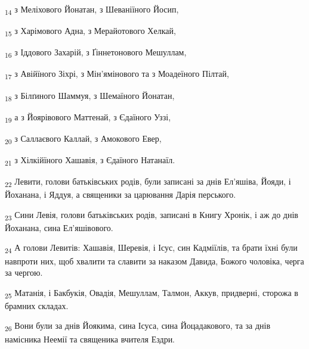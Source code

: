 \begin{tcolorbox}
\textsubscript{14} з Меліхового Йонатан, з Шеваніїного Йосип,
\end{tcolorbox}
\begin{tcolorbox}
\textsubscript{15} з Харімового Адна, з Мерайотового Хелкай,
\end{tcolorbox}
\begin{tcolorbox}
\textsubscript{16} з Іддового Захарій, з Ґіннетонового Мешуллам,
\end{tcolorbox}
\begin{tcolorbox}
\textsubscript{17} з Авійїного Зіхрі, з Мін'ямінового та з Моадеїного Пілтай,
\end{tcolorbox}
\begin{tcolorbox}
\textsubscript{18} з Білґиного Шаммуя, з Шемаїного Йонатан,
\end{tcolorbox}
\begin{tcolorbox}
\textsubscript{19} а з Йоярівового Маттенай, з Єдаїного Уззі,
\end{tcolorbox}
\begin{tcolorbox}
\textsubscript{20} з Саллаєвого Каллай, з Амокового Евер,
\end{tcolorbox}
\begin{tcolorbox}
\textsubscript{21} з Хілкійїного Хашавія, з Єдаїного Натанаїл.
\end{tcolorbox}
\begin{tcolorbox}
\textsubscript{22} Левити, голови батьківських родів, були записані за днів Ел'яшіва, Йояди, і Йоханана, і Яддуя, а священики за царювання Дарія перського.
\end{tcolorbox}
\begin{tcolorbox}
\textsubscript{23} Сини Левія, голови батьківських родів, записані в Книгу Хронік, і аж до днів Йоханана, сина Ел'яшівового.
\end{tcolorbox}
\begin{tcolorbox}
\textsubscript{24} А голови Левитів: Хашавія, Шеревія, і Ісус, син Кадміїлів, та брати їхні були навпроти них, щоб хвалити та славити за наказом Давида, Божого чоловіка, черга за чергою.
\end{tcolorbox}
\begin{tcolorbox}
\textsubscript{25} Матанія, і Бакбукія, Овадія, Мешуллам, Талмон, Аккув, придверні, сторожа в брамних складах.
\end{tcolorbox}
\begin{tcolorbox}
\textsubscript{26} Вони були за днів Йоякима, сина Ісуса, сина Йоцадакового, та за днів намісника Неемії та священика вчителя Ездри.
\end{tcolorbox}
